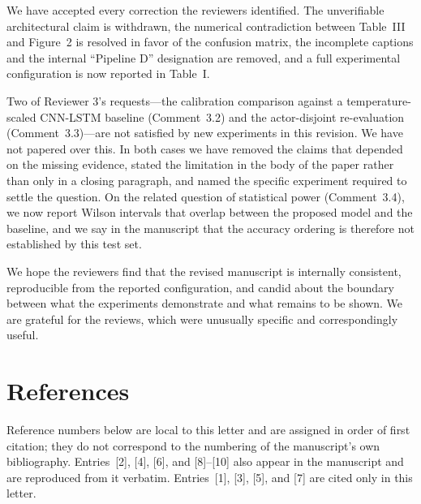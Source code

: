 We have accepted every correction the reviewers identified. The
unverifiable architectural claim is withdrawn, the numerical
contradiction between Table~III and Figure~2 is resolved in favor of the
confusion matrix, the incomplete captions and the internal ``Pipeline D''
designation are removed, and a full experimental configuration is now
reported in Table~I.

Two of Reviewer 3's requests---the calibration comparison against a
temperature-scaled CNN-LSTM baseline (Comment~3.2) and the
actor-disjoint re-evaluation (Comment~3.3)---are not satisfied by new
experiments in this revision. We have not papered over this. In both
cases we have removed the claims that depended on the missing evidence,
stated the limitation in the body of the paper rather than only in a
closing paragraph, and named the specific experiment required to settle
the question. On the related question of statistical power
(Comment~3.4), we now report Wilson intervals that overlap between the
proposed model and the baseline, and we say in the manuscript that the
accuracy ordering is therefore not established by this test set.

We hope the reviewers find that the revised manuscript is internally
consistent, reproducible from the reported configuration, and candid
about the boundary between what the experiments demonstrate and what
remains to be shown. We are grateful for the reviews, which were
unusually specific and correspondingly useful.

\section*{References}

\begin{singlespace}
\noindent\small Reference numbers below are local to this letter and are
assigned in order of first citation; they do not correspond to the
numbering of the manuscript's own bibliography. Entries~[2], [4], [6],
and [8]--[10] also appear in the manuscript and are reproduced from it
verbatim. Entries~[1], [3], [5], and [7] are cited only in this letter.
\end{singlespace}

\vspace{0.5\baselineskip}

